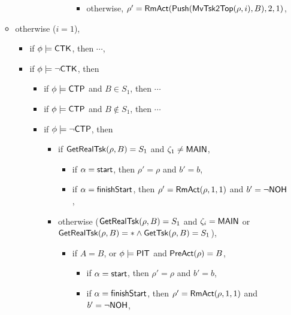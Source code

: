 \begin{itemize}
\begin{itemize}
\begin{itemize}
\begin{itemize}
\begin{itemize}
\begin{itemize}
\begin{itemize}
									\item otherwise, $\rho' = \mathsf{RmAct}(\mathsf{Push}(\mathsf{MvTsk2Top}(\rho, i), B), 2, 1)$, 
								\end{itemize}
							\end{itemize}
                    \end{itemize}
                \end{itemize}
        \end{itemize}
    \item otherwise ($i  = 1$),  
    \begin{itemize}
        \item if $\phi \models {\sf CTK}$, then $\cdots$, 
        \item if $\phi \models \neg {\sf CTK}$, then 
        \begin{itemize}
            \item if $\phi \models {\sf CTP}$ and $B \in S_1$, then $\cdots$
            \item if $\phi \models {\sf CTP}$ and $B\notin S_1$, then $\cdots$
            \item if $\phi \models \neg {\sf CTP}$, then
            \begin{itemize}
				\item if $\mathsf{GetRealTsk}(\rho,B) = S_1$ and $\zeta_1 \neq {\sf MAIN}$, 
				\begin{itemize}
					\item if $\alpha = {\mathsf{start} }$, then $\rho' = \rho$ and $b' = b$,
					\item if $\alpha = {\mathsf{finishStart} }$, then $\rho' = \mathsf{RmAct}(\rho, 1, 1)$ and $b' = \neg{\sf NOH}$,
				\end{itemize}
			\item otherwise ($\mathsf{GetRealTsk}(\rho,B) = S_1$ and $\zeta_i = {\sf MAIN}$ or $\mathsf{GetRealTsk}(\rho,B) = * \wedge\mathsf{GetTsk}(\rho,B) = S_1$), 
			\begin{itemize}
				\item if $A = B$, or $\phi \models{\sf PIT}$ and $\mathsf{PreAct}(\rho) = B$, 
				\begin{itemize}
					\item if $\alpha = {\mathsf{start} }$, then $\rho' = \rho$ and $b' = b$,
					\item if $\alpha = {\mathsf{finishStart} }$, then $\rho' = \mathsf{RmAct}(\rho, 1, 1)$ and $b' = \neg{\sf NOH}$,

\end{itemize}
\end{itemize}
\end{itemize}
\end{itemize}
\end{itemize}
\end{itemize}
\end{itemize}
